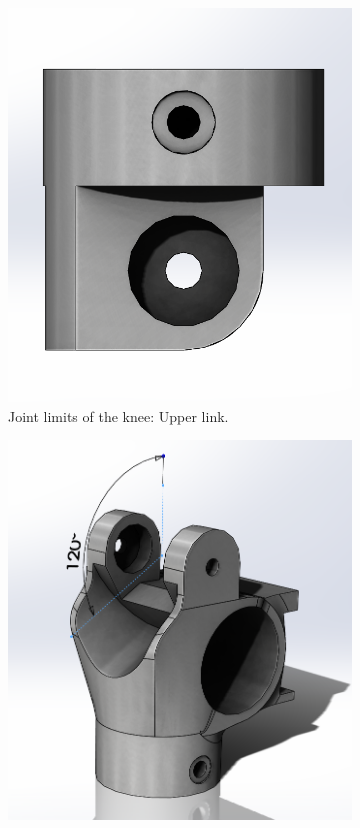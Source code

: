 \begin{figure}[ht!]
    \ContinuedFloat %
    \begin{subfigure}[b]{0.49\textwidth}
        \includegraphics[width=\textwidth]{figures/joint_limits_knee_upper.PNG}
        \caption{Joint limits of the knee: Upper link.}
        \label{fig:joint_limits_knee_upper}
    \end{subfigure}
    \begin{subfigure}[b]{0.49\textwidth}
        \includegraphics[width=\textwidth]{figures/joint_limits_knee_lower.PNG}

\end{subfigure}
\end{figure}
